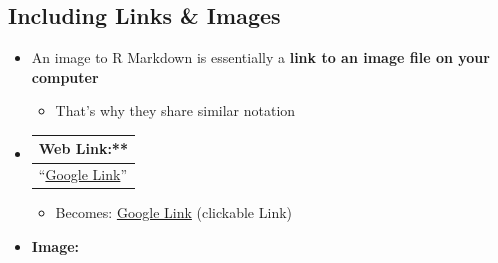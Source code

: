 \documentclass[
]{book}
\providecommand{\tightlist}{%
  \setlength{\itemsep}{0pt}\setlength{\parskip}{0pt}}
\begin{document}
\subsection{Including Links \& Images}\label{including-links-images}

\begin{itemize}
\item
  An image to R Markdown is essentially a \textbf{link to an image file on your computer}

  \begin{itemize}
  \tightlist
  \item
    That's why they share similar notation
  \end{itemize}
\item
  \begin{longtable}[]{@{}l@{}}
  \toprule\noalign{}
  Web Link:** \\
  \midrule\noalign{}
  \endhead
  \bottomrule\noalign{}
  \endlastfoot
  ``\href{www.google.com}{Google Link}'' \\
  \end{longtable}

  \begin{itemize}
  \tightlist
  \item
    Becomes: \href{https://www.google.com/}{Google Link} (clickable Link)
  \end{itemize}
\item
  \textbf{Image:}


\end{itemize}
\end{document}
